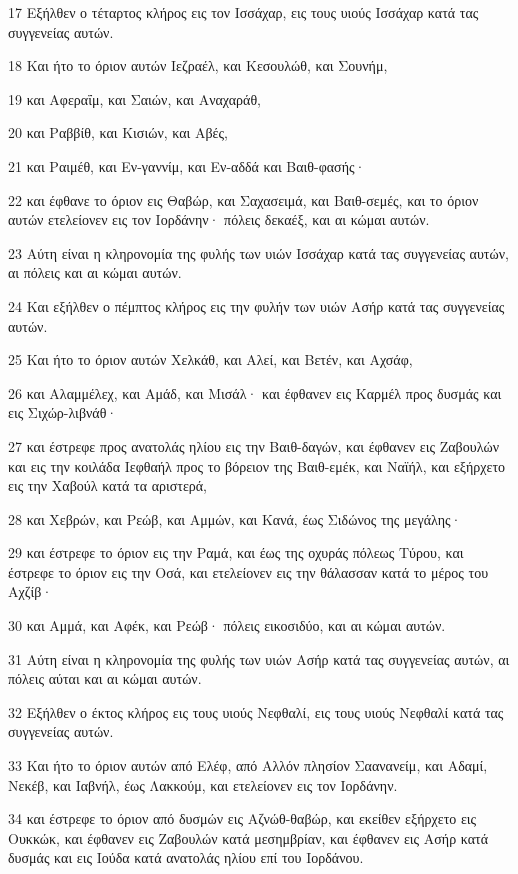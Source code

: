\par 17 Εξήλθεν ο τέταρτος κλήρος εις τον Ισσάχαρ, εις τους υιούς Ισσάχαρ κατά τας συγγενείας αυτών.
\par 18 Και ήτο το όριον αυτών Ιεζραέλ, και Κεσουλώθ, και Σουνήμ,
\par 19 και Αφεραΐμ, και Σαιών, και Αναχαράθ,
\par 20 και Ραββίθ, και Κισιών, και Αβές,
\par 21 και Ραιμέθ, και Εν-γαννίμ, και Εν-αδδά και Βαιθ-φασής·
\par 22 και έφθανε το όριον εις Θαβώρ, και Σαχασειμά, και Βαιθ-σεμές, και το όριον αυτών ετελείονεν εις τον Ιορδάνην· πόλεις δεκαέξ, και αι κώμαι αυτών.
\par 23 Αύτη είναι η κληρονομία της φυλής των υιών Ισσάχαρ κατά τας συγγενείας αυτών, αι πόλεις και αι κώμαι αυτών.
\par 24 Και εξήλθεν ο πέμπτος κλήρος εις την φυλήν των υιών Ασήρ κατά τας συγγενείας αυτών.
\par 25 Και ήτο το όριον αυτών Χελκάθ, και Αλεί, και Βετέν, και Αχσάφ,
\par 26 και Αλαμμέλεχ, και Αμάδ, και Μισάλ· και έφθανεν εις Καρμέλ προς δυσμάς και εις Σιχώρ-λιβνάθ·
\par 27 και έστρεφε προς ανατολάς ηλίου εις την Βαιθ-δαγών, και έφθανεν εις Ζαβουλών και εις την κοιλάδα Ιεφθαήλ προς το βόρειον της Βαιθ-εμέκ, και Ναϊήλ, και εξήρχετο εις την Χαβούλ κατά τα αριστερά,
\par 28 και Χεβρών, και Ρεώβ, και Αμμών, και Κανά, έως Σιδώνος της μεγάλης·
\par 29 και έστρεφε το όριον εις την Ραμά, και έως της οχυράς πόλεως Τύρου, και έστρεφε το όριον εις την Οσά, και ετελείονεν εις την θάλασσαν κατά το μέρος του Αχζίβ·
\par 30 και Αμμά, και Αφέκ, και Ρεώβ· πόλεις εικοσιδύο, και αι κώμαι αυτών.
\par 31 Αύτη είναι η κληρονομία της φυλής των υιών Ασήρ κατά τας συγγενείας αυτών, αι πόλεις αύται και αι κώμαι αυτών.
\par 32 Εξήλθεν ο έκτος κλήρος εις τους υιούς Νεφθαλί, εις τους υιούς Νεφθαλί κατά τας συγγενείας αυτών.
\par 33 Και ήτο το όριον αυτών από Ελέφ, από Αλλόν πλησίον Σαανανείμ, και Αδαμί, Νεκέβ, και Ιαβνήλ, έως Λακκούμ, και ετελείονεν εις τον Ιορδάνην.
\par 34 και έστρεφε το όριον από δυσμών εις Αζνώθ-θαβώρ, και εκείθεν εξήρχετο εις Ουκκώκ, και έφθανεν εις Ζαβουλών κατά μεσημβρίαν, και έφθανεν εις Ασήρ κατά δυσμάς και εις Ιούδα κατά ανατολάς ηλίου επί του Ιορδάνου.

